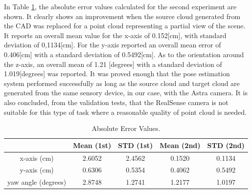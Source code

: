 In Table \ref{absolute}, the absolute error values calculated for the second experiment are shown. It clearly shows an improvement when the source cloud generated from the CAD was replaced for a point cloud representing a partial view of the scene. It reports an overall mean value for the x-axis of 0.152[cm],  with standard deviation of 0,1134[cm]. For the y-axis reported an overall mean error of 0.406[cm] with a standard deviation of 0.5492[cm]. As to the orientation around the z-axis, an overall mean of 1.21 [degrees] with a standard deviation of 1.019[degrees] was reported. It was proved enough that the pose estimation system performed successfully as long as the source cloud and target cloud are generated from the same sensory device, in our case, with the Astra camera. It is also concluded, from the validation tests, that the RealSense camera is not suitable for this type of task where a reasonable quality of point cloud is needed.  


\begin{table}[ht]
\renewcommand{\arraystretch}{1.3}
\caption{Absolute Error Values.}
\label{absolute}
\centering
\begin{tabular}{|c||c||c||c||c|}
\hline
  & Mean (1st)& STD (1st) &  Mean (2nd)& STD (2nd) \\
\hline
x-axis (cm) & 2.6052 & 2.4562 & 0.1520 & 0.1134\\
\hline
y-axis (cm) & 0.6306 & 0.5354 & 0.4062 & 0.5492\\
\hline
yaw angle (degrees)& 2.8748 & 1.2741 & 1.2177 & 1.0197\\
\hline
\hline
\end{tabular}
\end{table}


